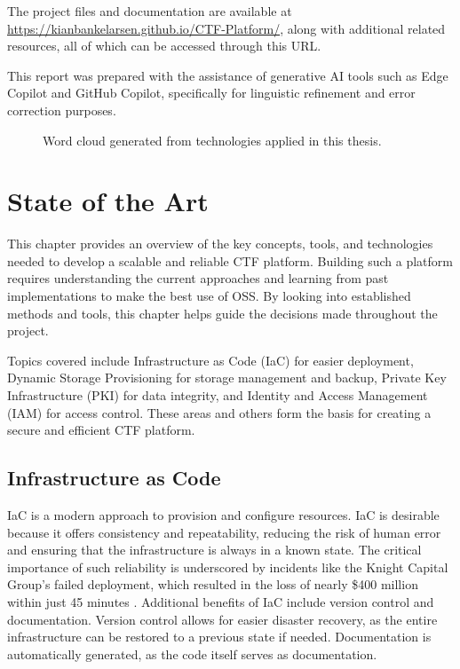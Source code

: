 The project files and documentation are available at \url{https://kianbankelarsen.github.io/CTF-Platform/}, along with additional related resources, all of which can be accessed through this URL.

This report was prepared with the assistance of generative AI tools such as Edge Copilot and GitHub Copilot, specifically for linguistic refinement and error correction purposes.

\vspace*{\fill}

\begin{figure}[H]
    \centering
    
    \caption{Word cloud generated from technologies applied in this thesis.}
    \label{fig:wordcloud}
\end{figure}

\vspace*{\fill}

\chapter{State of the Art}

This chapter provides an overview of the key concepts, tools, and technologies needed to develop a scalable and reliable CTF platform. Building such a platform requires understanding the current approaches and learning from past implementations to make the best use of OSS. By looking into established methods and tools, this chapter helps guide the decisions made throughout the project.

Topics covered include Infrastructure as Code (IaC) for easier deployment, Dynamic Storage Provisioning for storage management and backup, Private Key Infrastructure (PKI) for data integrity, and Identity and Access Management (IAM) for access control. These areas and others form the basis for creating a secure and efficient CTF platform.

\section{Infrastructure as Code}

IaC is a modern approach to provision and configure resources. IaC is desirable because it offers consistency and repeatability, reducing the risk of human error and ensuring that the infrastructure is always in a known state. The critical importance of such reliability is underscored by incidents like the Knight Capital Group's failed deployment, which resulted in the loss of nearly \$400 million within just 45 minutes \Parencite{seven2014knightmare}. Additional benefits of IaC include version control and documentation. Version control allows for easier disaster recovery, as the entire infrastructure can be restored to a previous state if needed. Documentation is automatically generated, as the code itself serves as documentation. 

